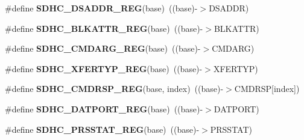 \begin{DoxyCompactItemize}
\item 
\#define {\bfseries S\+D\+H\+C\+\_\+\+D\+S\+A\+D\+D\+R\+\_\+\+R\+EG}(base)~((base)-\/$>$D\+S\+A\+D\+DR)\hypertarget{group__SDHC__Register__Accessor__Macros_ga1cc560682c121f05e541df1777abbd4c}{}\label{group__SDHC__Register__Accessor__Macros_ga1cc560682c121f05e541df1777abbd4c}

\item 
\#define {\bfseries S\+D\+H\+C\+\_\+\+B\+L\+K\+A\+T\+T\+R\+\_\+\+R\+EG}(base)~((base)-\/$>$B\+L\+K\+A\+T\+TR)\hypertarget{group__SDHC__Register__Accessor__Macros_ga8133bf575b6792e05d833efe2aa39e2c}{}\label{group__SDHC__Register__Accessor__Macros_ga8133bf575b6792e05d833efe2aa39e2c}

\item 
\#define {\bfseries S\+D\+H\+C\+\_\+\+C\+M\+D\+A\+R\+G\+\_\+\+R\+EG}(base)~((base)-\/$>$C\+M\+D\+A\+RG)\hypertarget{group__SDHC__Register__Accessor__Macros_ga4c4e15d1df4b9fa8f887cea053ecde62}{}\label{group__SDHC__Register__Accessor__Macros_ga4c4e15d1df4b9fa8f887cea053ecde62}

\item 
\#define {\bfseries S\+D\+H\+C\+\_\+\+X\+F\+E\+R\+T\+Y\+P\+\_\+\+R\+EG}(base)~((base)-\/$>$X\+F\+E\+R\+T\+YP)\hypertarget{group__SDHC__Register__Accessor__Macros_ga5299ec205ad7aa587b9df4c3a0d0d7de}{}\label{group__SDHC__Register__Accessor__Macros_ga5299ec205ad7aa587b9df4c3a0d0d7de}

\item 
\#define {\bfseries S\+D\+H\+C\+\_\+\+C\+M\+D\+R\+S\+P\+\_\+\+R\+EG}(base,  index)~((base)-\/$>$C\+M\+D\+R\+SP\mbox{[}index\mbox{]})\hypertarget{group__SDHC__Register__Accessor__Macros_ga2211777fea01d3b20cef3e52b29f41cf}{}\label{group__SDHC__Register__Accessor__Macros_ga2211777fea01d3b20cef3e52b29f41cf}

\item 
\#define {\bfseries S\+D\+H\+C\+\_\+\+D\+A\+T\+P\+O\+R\+T\+\_\+\+R\+EG}(base)~((base)-\/$>$D\+A\+T\+P\+O\+RT)\hypertarget{group__SDHC__Register__Accessor__Macros_ga640fff35a27e3710eacdd3ffe152e65c}{}\label{group__SDHC__Register__Accessor__Macros_ga640fff35a27e3710eacdd3ffe152e65c}

\item 
\#define {\bfseries S\+D\+H\+C\+\_\+\+P\+R\+S\+S\+T\+A\+T\+\_\+\+R\+EG}(base)~((base)-\/$>$P\+R\+S\+S\+T\+AT)\hypertarget{group__SDHC__Register__Accessor__Macros_ga751116a9a35fb6faec53ba0b847525c7}{}\label{group__SDHC__Register__Accessor__Macros_ga751116a9a35fb6faec53ba0b847525c7}


\end{DoxyCompactItemize}
